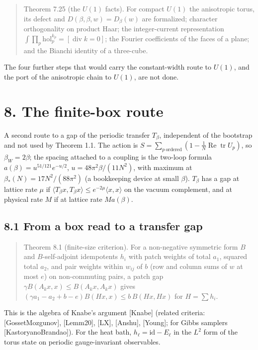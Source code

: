 \documentclass[10pt,letterpaper,twocolumn]{article}
\begin{document}
\begin{quote}
Theorem 7.25 (the \(U(1)\) facts). For compact \(U(1)\) the anisotropic torus, its defect and \(D(\beta,\beta,w)=D_\beta(w)\) are formalized; character orthogonality on product Haar; the integer-current representation \(\int\prod_p\mathrm{hol}_p^{k_p}=[\operatorname{div}k=0]\); the Fourier coefficients of the faces of a plane; and the Bianchi identity of a three-cube.
\end{quote}

The four further steps that would carry the constant-width route to \(U(1)\), and the port of the anisotropic chain to \(U(1)\), are not done.

\section{8. The finite-box route}\label{8-the-finite-box-route}

A second route to a gap of the periodic transfer \(T_\beta\), independent of the bootstrap and not used by Theorem 1.1. The action is \(S=\sum_{p\ \text{ordered}}(1-\tfrac1N\operatorname{Re}\operatorname{tr}U_p)\), so \(\beta_W=2\beta\); the spacing attached to a coupling is the two-loop formula \(a(\beta)=u^{51/121}e^{-u/2}\), \(u=48\pi^2\beta/(11N^2)\), with maximum at \(\beta_\ast(N)=17N^2/(88\pi^2)\) (a bookkeeping device at small \(\beta\)). \(T_\beta\) has a gap at lattice rate \(\mu\) if \(\langle T_\beta x,T_\beta x\rangle\le e^{-2\mu}\langle x,x\rangle\) on the vacuum complement, and at physical rate \(M\) if at lattice rate \(Ma(\beta)\).

\subsection{8.1 From a box read to a transfer gap}\label{81-from-a-box-read-to-a-transfer-gap}

\begin{quote}
Theorem 8.1 (finite-size criterion). For a non-negative symmetric form \(B\) and \(B\)-self-adjoint idempotents \(h_i\) with patch weights of total \(a_1\), squared total \(a_2\), and pair weights within \(w_{ij}\) of \(b\) (row and column sums of \(w\) at most \(e\)) on non-commuting pairs, a patch gap \(\gamma B(A_kx,x)\le B(A_kx,A_kx)\) gives \((\gamma a_1-a_2+b-e)B(Hx,x)\le b\,B(Hx,Hx)\) for \(H=\sum h_i\).
\end{quote}

This is the algebra of Knabe's argument {[}Knabe{]} (related criteria: {[}GossetMozgunov{]}, {[}Lemm20{]}, {[}LX{]}, {[}Anshu{]}, {[}Young{]}; for Gibbs samplers {[}KastoryanoBrandao{]}). For the heat bath, \(h_\ell=\mathrm{id}-E_\ell\) in the \(L^2\) form of the torus state on periodic gauge-invariant observables.
\end{document}
